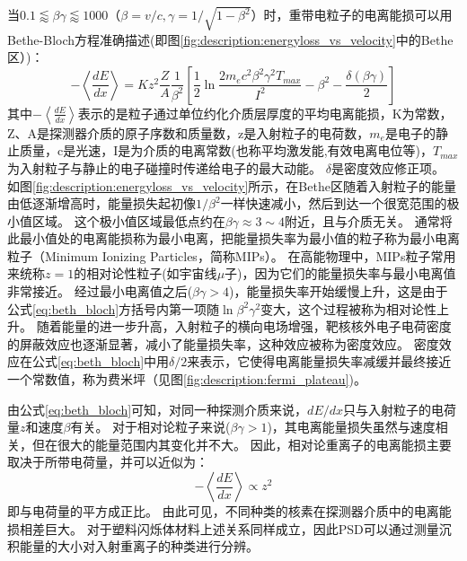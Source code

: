 当$0.1\lessapprox\beta\gamma\lessapprox1000$（$\beta=v/c,\gamma=1/\sqrt{1-{\beta}^2}$）时，重带电粒子的电离能损可以用Bethe-Bloch方程准确描述(即图\ref{fig:description:energyloss_vs_velocity}中的Bethe区）)：
\begin{equation}\label{eq:beth_bloch}
-\left\langle\frac{dE}{dx}\right\rangle = Kz^2\frac{Z}{A}\frac{1}{{\beta}^2}
\left[\frac{1}{2}\ln\frac{2m_ec^2{\beta}^2{\gamma}^2T_{max}}{I^2}-{\beta}^2-\frac{\delta(\beta\gamma)}{2}\right]
\end{equation}
其中$-\left\langle\frac{dE}{dx}\right\rangle$表示的是粒子通过单位约化介质层厚度的平均电离能损，K为常数，Z、A是探测器介质的原子序数和质量数，z是入射粒子的电荷数，$m_e$是电子的静止质量，c是光速，I是为介质的电离常数(也称平均激发能,有效电离电位等)，$T_{max}$为入射粒子与静止的电子碰撞时传递给电子的最大动能。
$\delta$是密度效应修正项。
如图\ref{fig:description:energyloss_vs_velocity}所示，在Bethe区随着入射粒子的能量由低逐渐增高时，能量损失起初像$1/{\beta}^2$一样快速减小，然后到达一个很宽范围的极小值区域。
这个极小值区域最低点约在$\beta\gamma\approx3\sim4$附近，且与介质无关。
通常将此最小值处的电离能损称为最小电离，把能量损失率为最小值的粒子称为最小电离粒子（Minimum Ionizing Particles，简称MIPs）。
在高能物理中，MIPs粒子常用来统称$z=1$的相对论性粒子(如宇宙线$\mu$子)，因为它们的能量损失率与最小电离值非常接近。
经过最小电离值之后($\beta\gamma>4$)，能量损失率开始缓慢上升，这是由于公式\ref{eq:beth_bloch}方括号内第一项随$\ln{\beta}^2{\gamma}^2$变大，这个过程被称为相对论性上升。
随着能量的进一步升高，入射粒子的横向电场增强，靶核核外电子电荷密度的屏蔽效应也逐渐显著，减小了能量损失率，这种效应被称为密度效应。
密度效应在公式\ref{eq:beth_bloch}中用$\delta/2$来表示，它使得电离能量损失率减缓并最终接近一个常数值，称为费米坪（见图\ref{fig:description:fermi_plateau})。

由公式\ref{eq:beth_bloch}可知，对同一种探测介质来说，$dE/dx$只与入射粒子的电荷量$z$和速度$\beta$有关。
对于相对论粒子来说($\beta\gamma>1$)，其电离能量损失虽然与速度相关，但在很大的能量范围内其变化并不大。
因此，相对论重离子的电离能损主要取决于所带电荷量，并可以近似为：
\begin{equation}
-\left\langle\frac{dE}{dx}\right\rangle \propto z^2
\end{equation}
即与电荷量的平方成正比。
由此可见，不同种类的核素在探测器介质中的电离能损相差巨大。
对于塑料闪烁体材料上述关系同样成立，因此PSD可以通过测量沉积能量的大小对入射重离子的种类进行分辨。

